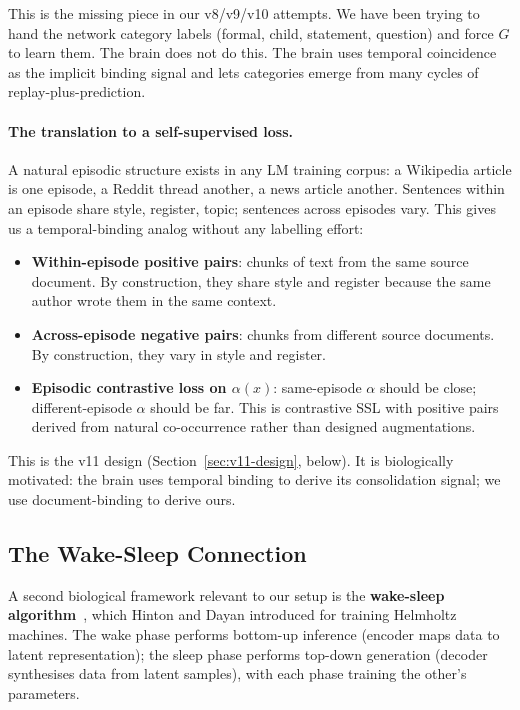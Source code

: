 \documentclass[11pt, a4paper]{article}
\theoremstyle{plain}
\theoremstyle{definition}
\theoremstyle{remark}
\begin{document}
This is the missing piece in our v8/v9/v10 attempts.
We have been trying to hand the network category labels (formal, child, statement, question) and force $G$ to learn them.
The brain does not do this.
The brain uses temporal coincidence as the implicit binding signal and lets categories emerge from many cycles of replay-plus-prediction.

\paragraph{The translation to a self-supervised loss.}
A natural episodic structure exists in any LM training corpus: a Wikipedia article is one episode, a Reddit thread another, a news article another.
Sentences within an episode share style, register, topic; sentences across episodes vary.
This gives us a temporal-binding analog without any labelling effort:

\begin{itemize}[nosep]
\item \textbf{Within-episode positive pairs}: chunks of text from the same source document. By construction, they share style and register because the same author wrote them in the same context.
\item \textbf{Across-episode negative pairs}: chunks from different source documents. By construction, they vary in style and register.
\item \textbf{Episodic contrastive loss on $\alpha(x)$}: same-episode $\alpha$ should be close; different-episode $\alpha$ should be far. This is contrastive SSL with positive pairs derived from natural co-occurrence rather than designed augmentations.
\end{itemize}

This is the v11 design (Section~\ref{sec:v11-design}, below).
It is biologically motivated: the brain uses temporal binding to derive its consolidation signal; we use document-binding to derive ours.

\subsection{The Wake-Sleep Connection}

A second biological framework relevant to our setup is the \textbf{wake-sleep algorithm}~\cite{hinton1995wakesleep}, which Hinton and Dayan introduced for training Helmholtz machines.
The wake phase performs bottom-up inference (encoder maps data to latent representation); the sleep phase performs top-down generation (decoder synthesises data from latent samples), with each phase training the other's parameters.
\end{document}
